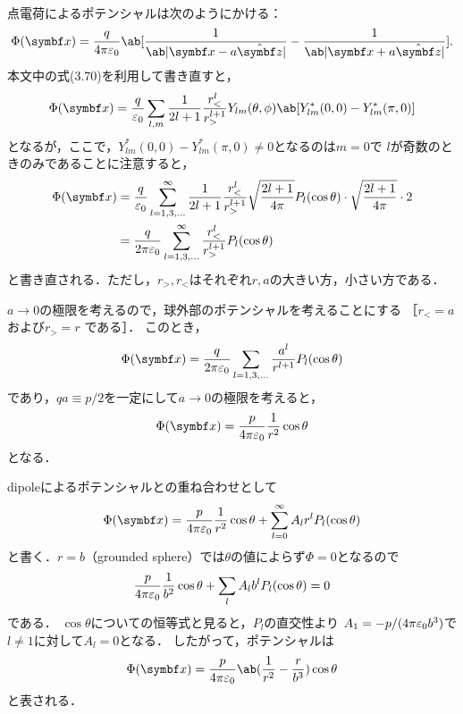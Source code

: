   \hrulefill\\
  点電荷によるポテンシャルは次のようにかける：
  \begin{gather}%
    \Phi(\bs{x}) = \frac{q}{4\pi \eps_0}
    \ab[\frac{1}{\ab|\bs{x} - a\hat{\bs{z}}|}
    - \frac{1}{\ab|\bs{x} + a \hat{\bs{z}}|}].
  \end{gather}%
  本文中の式(3.70)を利用して書き直すと，
  \begin{gather}%
    \Phi(\bs{x}) = \frac{q}{\eps_0} \sum_{l,m} \frac{1}{2l+1} \frac{r_<^l}{r_>^{l+1}}
    Y_{lm}(\theta,\phi) \ab[Y^*_{lm}(0,0) - Y^*_{lm}(\pi,0)]
  \end{gather}%
  となるが，ここで，$Y^*_{lm}(0,0)-Y^*_{lm}(\pi,0) \neq 0$となるのは$m = 0$で
  $l$が奇数のときのみであることに注意すると，
  \begin{align}%
    \Phi(\bs{x}) &= \frac{q}{\eps_0} \sum_{l=1,3,\ldots}^{\infty} \frac{1}{2l+1} \frac{r_<^l}{r_>^{l+1}} \sqrt{\frac{2l+1}{4\pi}}P_l(\cos\theta) 
    \cdot \sqrt{\frac{2l+1}{4\pi}}\cdot 2\notag\\
    &= \frac{q}{2\pi\eps_0} \sum_{l=1,3,\ldots}^\infty \frac{r_<^l}{r_>^{l+1}} P_l(\cos\theta)
  \end{align}%
  と書き直される．ただし，$r_>, r_<$はそれぞれ$r, a$の大きい方，小さい方である．

  $a\to0$の極限を考えるので，球外部のポテンシャルを考えることにする
  ［$r_< = a$および$r_> = r$
  である］．
  このとき，
  \begin{gather}%
    \Phi(\bs{x}) = \frac{q}{2\pi\eps_0}\sum_{l=1,3,\ldots}\frac{a^l}{r^{l+1}} P_l(\cos\theta)
  \end{gather}%
  であり，$qa \equiv p/2$を一定にして$a \to 0$の極限を考えると，
  \begin{gather}%
    \Phi(\bs{x}) = \frac{p}{4\pi\eps_0} \frac{1}{r^2}\cos\theta
  \end{gather}%
  となる．

  dipoleによるポテンシャルとの重ね合わせとして
  \begin{gather}%
    \Phi(\bs{x}) = \frac{p}{4\pi\eps_0} \frac{1}{r^2}\cos\theta + \sum_{l=0}^\infty A_l r^l P_l(\cos\theta)
  \end{gather}%
  と書く．$r = b$（grounded sphere）では$\theta$の値によらず$\Phi = 0$となるので
  \begin{gather}%
    \frac{p}{4\pi\eps_0} \frac{1}{b^2} \cos\theta + \sum_l A_l b^l P_l(\cos\theta) = 0
  \end{gather}%
  である．
  $\cos\theta$についての恒等式と見ると，$P_l$の直交性より
  $A_1 =-p/(4\pi\varepsilon_0 b^3)$で$l \neq 1$に対して$ A_l = 0 $となる．
  したがって，ポテンシャルは
  \begin{gather}%
    \Phi(\bs{x}) = \frac{p}{4\pi \eps_0} \ab(\frac{1}{r^2} - \frac{r}{b^3}) \cos\theta
  \end{gather}%
  と表される．

